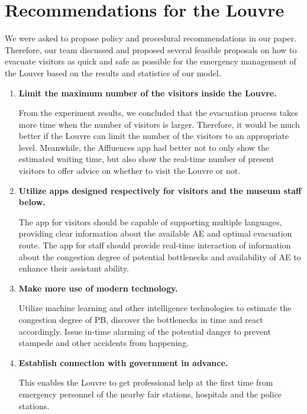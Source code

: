 \documentclass[12pt]{article}
\begin{document}
\section{Recommendations for the Louvre} \label{section:6}
We were asked to propose policy and procedural recommendations in our paper. Therefore, our team discussed and proposed several feasible proposals on how to evacuate visitors as quick and safe as possible for the emergency management of the Louver based on the results and statistics of our model.
\begin{enumerate}
\item \textbf{Limit the maximum number of the visitors inside the Louvre.} 

From the experiment results, we concluded that the evacuation process takes more time when the number of visitors is larger. Therefore, it would be much better if the Louvre can limit the number of the visitors to an appropriate level. Meanwhile, the Affluences app had better not to only show the estimated waiting time, but also show the real-time number of present visitors to offer advice on whether to visit the Louvre or not.


\item \textbf{Utilize apps designed respectively for visitors and the museum staff below.}

The app for visitors should be capable of supporting multiple languages, providing clear information about the available AE and optimal evacuation route. 
The app for staff should provide real-time interaction of information about the congestion degree of potential bottlenecks and availability of AE to enhance their assistant ability.
  
\item \textbf{Make more use of modern technology.} 

Utilize machine learning and other intelligence technologies to estimate the congestion degree of PB, discover the bottlenecks in time and react accordingly. Issue in-time alarming of the potential danger to prevent stampede and other accidents from happening. 

\item \textbf{Establish connection with government in advance.}

This enables the Louvre to get professional help at the first time from emergency personnel of the nearby fair stations, hospitals and the police stations.  

\end{enumerate}
\end{document}

